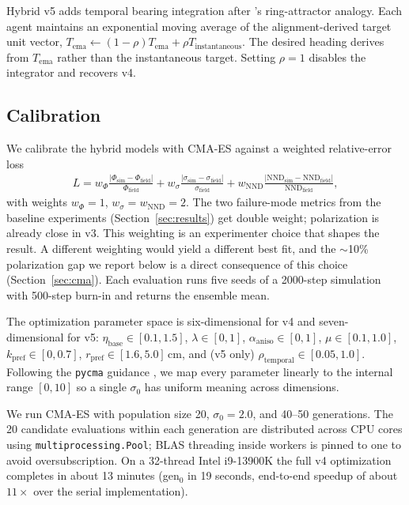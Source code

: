 \documentclass[11pt]{article}
\begin{document}
Hybrid v5 adds temporal bearing integration after \citet{sayin2025}'s
ring-attractor analogy. Each agent maintains an exponential moving
average of the alignment-derived target unit vector, $T_\text{ema}
\leftarrow (1-\rho) T_\text{ema} + \rho T_\text{instantaneous}$. The
desired heading derives from $T_\text{ema}$ rather than the
instantaneous target. Setting $\rho = 1$ disables the integrator and
recovers v4.

\subsection{Calibration}

We calibrate the hybrid models with CMA-ES against a weighted relative-error
loss
\begin{align}
L = w_\Phi \frac{|\Phi_\text{sim} - \Phi_\text{field}|}{\Phi_\text{field}}
  + w_\sigma \frac{|\sigma_\text{sim} - \sigma_\text{field}|}{\sigma_\text{field}}
  + w_\text{NND} \frac{|\text{NND}_\text{sim} - \text{NND}_\text{field}|}{\text{NND}_\text{field}},
\end{align}
with weights $w_\Phi = 1$, $w_\sigma = w_\text{NND} = 2$. The two
failure-mode metrics from the baseline experiments
(Section~\ref{sec:results}) get double weight; polarization is already
close in v3. This weighting is an experimenter choice that shapes the
result. A different weighting would yield a different best fit, and the
$\sim$10\% polarization gap we report below is a direct consequence of
this choice (Section~\ref{sec:cma}). Each evaluation runs five seeds of
a 2000-step simulation with 500-step burn-in and returns the ensemble
mean.

The optimization parameter space is six-dimensional for v4 and
seven-dimensional for v5: $\eta_\text{base} \in [0.1, 1.5]$,
$\lambda \in [0, 1]$, $\alpha_\text{aniso} \in [0, 1]$,
$\mu \in [0.1, 1.0]$, $k_\text{pref} \in [0, 0.7]$,
$r_\text{pref} \in [1.6, 5.0]$\,cm, and (v5 only)
$\rho_\text{temporal} \in [0.05, 1.0]$. Following the \texttt{pycma}
guidance \citep{pycma}, we map every parameter linearly to the internal
range $[0, 10]$ so a single $\sigma_0$ has uniform meaning across
dimensions.

We run CMA-ES with population size 20, $\sigma_0 = 2.0$, and 40--50
generations. The 20 candidate evaluations within each generation are
distributed across CPU cores using \texttt{multiprocessing.Pool}; BLAS
threading inside workers is pinned to one to avoid oversubscription. On
a 32-thread Intel i9-13900K the full v4 optimization completes in
about 13 minutes (gen$_0$ in 19 seconds, end-to-end speedup of about
$11{\times}$ over the serial implementation).
\end{document}
